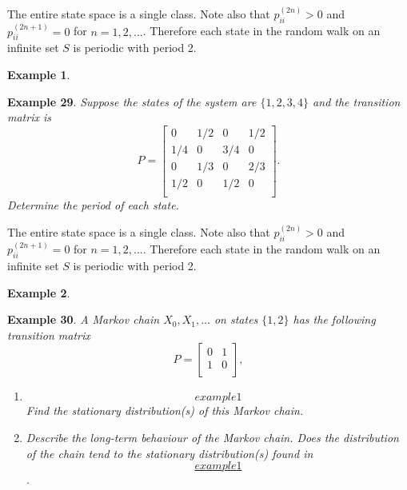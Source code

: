 \documentclass[
]{book}
\theoremstyle{definition}
\theoremstyle{definition}
\newtheorem{example}{Example}[chapter]
\theoremstyle{definition}
\theoremstyle{definition}
\theoremstyle{remark}
\begin{document}
The entire state space is a single class. Note also that
\(p^{(2n)}_{ii} > 0\) and \(p^{(2n+1)}_{ii} = 0\) for \(n = 1,2,\ldots\).
Therefore each state in the random walk on an infinite set \(S\) is
periodic with period 2.

\begin{example}
\protect\hypertarget{exm:unlabeled-div-31}{}\label{exm:unlabeled-div-31}

\textbf{Example 29}. \emph{Suppose the states of the system are \(\{1,2,3,4 \}\) and
the transition matrix is \[P = \begin{bmatrix}
    0 & 1/2 & 0 & 1/2    \\
    1/4 & 0 & 3/4 & 0   \\
    0 & 1/3 & 0 & 2/3    \\
    1/2 & 0 & 1/2 & 0   \\
\end{bmatrix}.\] Determine the period of each state.}

\end{example}

The entire state space is a single class. Note also that
\(p^{(2n)}_{ii} > 0\) and \(p^{(2n+1)}_{ii} = 0\) for \(n = 1,2,\ldots\).
Therefore each state in the random walk on an infinite set \(S\) is
periodic with period 2.

\begin{example}
\protect\hypertarget{exm:exampleLongTerm}{}\label{exm:exampleLongTerm}

\textbf{Example 30}. \emph{A Markov chain \(X_0, X_1, \ldots\) on states \(\{1,2\}\)
has the following transition matrix \[P = \begin{bmatrix}
    0 & 1   \\
    1 & 0   \\
\end{bmatrix},\]}

\begin{enumerate}
\def\labelenumi{\arabic{enumi}.}
\item
  \emph{\protect\hypertarget{example1}{}{\[example1\]} Find the stationary
  distribution(s) of this Markov chain.}
\item
  \emph{Describe the long-term behaviour of the Markov chain. Does the
  distribution of the chain tend to the stationary distribution(s)
  found in \protect\hyperlink{example1}{\[example1\]}.}
\end{enumerate}

\end{example}
\end{document}

